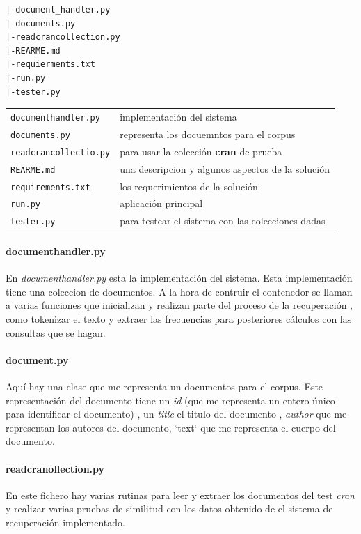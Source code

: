 \documentclass{llncs}
\begin{document}
\begin{verbatim}
|-document_handler.py
|-documents.py
|-readcrancollection.py
|-REARME.md
|-requierments.txt
|-run.py
|-tester.py
\end{verbatim}

\begin{flushleft}
\begin{tabular}{@{}p{4cm}l}
{\tt documenthandler.py}& implementaci\'on del sistema\\[2pt]
{\tt documents.py}  & representa los docuemntos para el corpus\\[2pt]
{\tt readcrancollectio.py}  & para usar la colecci\'on \textbf{cran} de prueba\\[2pt]
{\tt REARME.md}  & una descripcion y algunos aspectos de la soluci\'on \\[2pt]
{\tt requirements.txt}& los requerimientos de la soluci\'on\\
{\tt run.py}  & aplicaci\'on principal\\
{\tt tester.py}  & para testear el sistema con las colecciones dadas\\
\end{tabular}
\end{flushleft}

\paragraph{documenthandler.py}
En \textit{documenthandler.py} esta la implementaci\'on del sistema. Esta implementaci\'on tiene una coleccion de documentos. A la hora de contruir el contenedor se llaman a varias funciones que inicializan y realizan parte del proceso de la recuperaci\'on , como tokenizar el texto y extraer las frecuencias para posteriores c\'alculos con las consultas que se hagan.

\paragraph{document.py}
Aqu\'i hay una clase que me representa un documentos para el corpus. Este representaci\'on del documento tiene un \textit{id} (que me representa un entero \'unico para identificar el documento) , un \textit{title} el titulo del documento , \textit{author} que me representan los autores del documento, `text` que me representa el cuerpo del documento.

\paragraph{readcranollection.py} 
En este fichero hay varias rutinas para leer y extraer los documentos del test \textit{cran} y realizar varias pruebas de similitud con los datos obtenido de el sistema de recuperaci\'on implementado.
\end{document}
